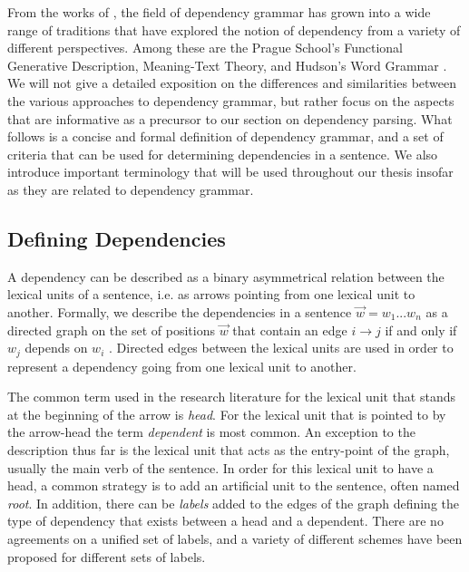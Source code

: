 From the works of \citeauthor{Tes:15}, the field of dependency grammar has grown into a wide range of traditions that have explored the notion of dependency from a variety of different perspectives. Among these are the Prague School's Functional Generative Description, Meaning-Text Theory, and Hudson's Word Grammar \cite{Sgall:86, Mel:88, Hudson:90}. We will not give a detailed exposition on the differences and similarities between the various approaches to dependency grammar, but rather focus on the aspects that are informative as a precursor to our section on dependency parsing. What follows is a concise and formal definition of dependency grammar, and a set of criteria that can be used for determining dependencies in a sentence. We also introduce important terminology that will be used throughout our thesis insofar as they are related to dependency grammar.

\subsection{Defining Dependencies}
\label{definitions}

A dependency can be described as a binary asymmetrical relation between the lexical units of a sentence, i.e. as arrows pointing from one lexical unit to another. Formally, we describe the dependencies in a sentence $\vec{w} = w_1 ... w_n$ as a directed graph on the set of positions $\vec{w}$ that contain an edge $i \rightarrow j$ if and only if $w_j$ depends on $w_i$ \cite{Kuhl:10}. Directed edges between the lexical units are used in order to represent a dependency going from one lexical unit to another.

The common term used in the research literature for the lexical unit that stands at the beginning of the arrow is \textit{head}. For the lexical unit that is pointed to by the arrow-head the term \textit{dependent} is most common. An exception to the description thus far is the lexical unit that acts as the entry-point of the graph, usually the main verb of the sentence. In order for this lexical unit to have a head, a common strategy is to add an artificial unit to the sentence, often named \textit{root}. In addition, there can be \textit{labels} added to the edges of the graph defining the type of dependency that exists between a head and a dependent. There are no agreements on a unified set of labels, and a variety of different schemes have been proposed for different sets of labels.


